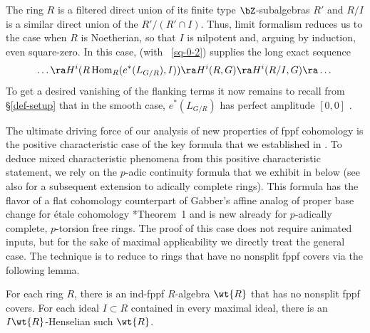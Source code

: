 \bpf
The ring $R$ is a filtered direct union of its finite type $\bZ$-subalgebras $R'$ and $R/I$ is a similar direct union of the $R'/(R' \cap I)$. Thus, limit formalism reduces us to the case when $R$ is Noetherian, so that $I$ is nilpotent and, arguing by induction, even square-zero. In this case,  (with ~\ref{sq-0-2}) supplies the long exact sequence
\[
\dotsc \ra H^{i}(R\Hom_R(e^*(L_{G/R}), I)) \ra H^i(R, G) \ra H^i(R/I, G) \ra%
\dotsc
\]
To get a desired vanishing of the flanking terms it now remains to recall from \S\ref{def-setup} that in the smooth  case, $e^*(L_{G/R})$ has perfect amplitude $[0, 0]$ \resp{$[-1, 0]$}.
\epf















 \label{section:continuity-formula}



The ultimate driving force of our analysis of new properties of fppf cohomology is the positive characteristic case of the key formula that we established in . To deduce mixed characteristic phenomena from this positive characteristic statement, we rely on the $p$-adic continuity formula that we exhibit in  below (see also  for a subsequent extension to adically complete rings). This formula has the flavor of a flat cohomology counterpart of Gabber's affine analog of proper base change for \'{e}tale cohomology \cite{Gab94a}*{Theorem~1} and is new already for $p$-adically complete, $p$-torsion free rings. The proof of this case does not require animated inputs, but for the sake of maximal applicability we directly treat the general case. The technique is to
 reduce to rings that have no nonsplit fppf covers via the following lemma.



\blem \label{lem:large-cover}
For each ring $R$, there is an ind-fppf $R$-algebra $\wt{R}$ that has no nonsplit fppf covers. For each ideal $I \subset R$ contained in every maximal ideal, there is an $I\wt{R}$-Henselian such $\wt{R}$. %
\elem

